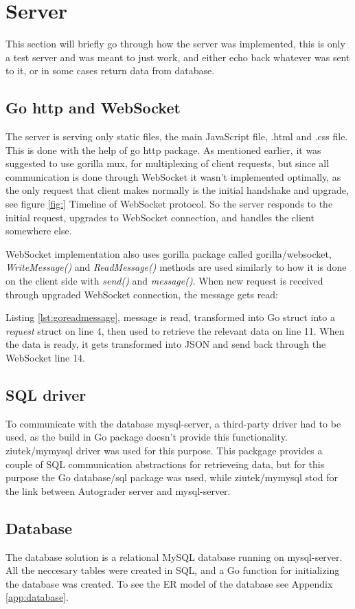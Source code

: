 \section{Server}
This section will briefly go through how the server was implemented, this is only a test server and was meant to just work, and either echo back whatever was sent to it, or in some cases return data from database.
\subsection{Go http and WebSocket}
The server is serving only static files, the main JavaScript file, .html and .css file. This is done with the help of go http package. As mentioned earlier, it was suggested to use gorilla mux, for multiplexing of client requests, but since all communication is done through WebSocket it wasn't implemented optimally, as the only request that client makes normally is the initial handshake and upgrade, see figure \ref{fig:} Timeline of WebSocket protocol. So the server responds to the initial request, upgrades to WebSocket connection, and handles the client somewhere else.

WebSocket implementation also uses gorilla package called gorilla/websocket, \emph{WriteMessage()} and \emph{ReadMessage()} methods are used similarly to how it is done on the client side with \emph{send()} and \emph{message()}. When new request is received through upgraded WebSocket connection, the message gets read: 


Listing \ref{lst:goreadmessage}, message is read, transformed into Go struct into a \emph{request} struct on line 4, then used to retrieve the relevant data on line 11. When the data is ready, it gets transformed into JSON and send back through the WebSocket line 14.

\subsection{SQL driver}
To communicate with the database mysql-server, a third-party driver had to be used, as the build in Go package doesn't provide this functionality. ziutek/mymysql \cite{ziutek} driver was used for this purpose. This packgage provides a couple of SQL communication abstractions for retrieveing data, but for this purpose the Go database/sql package was used, while ziutek/mymysql stod for the link between Autograder server and mysql-server. 

\subsection{Database}\label{sec:database}
The database solution is a relational MySQL database running on mysql-server. All the neccesary tables were created in SQL, and a Go function for initializing the database was created. To see the ER model of the database see Appendix \ref{app:database}. 